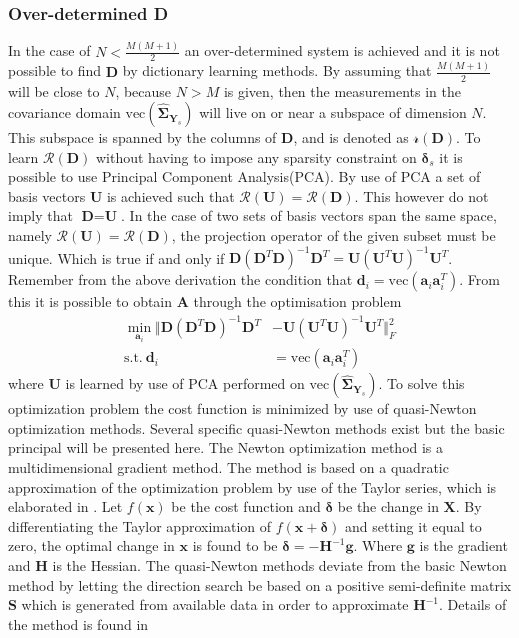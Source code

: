 \subsubsection*{Over-determined \textbf{D}}
In the case of $N < \frac{M(M+1)}{2}$ an over-determined system is achieved and it is not possible to find $\textbf{D}$ by dictionary learning methods.
By assuming that $\frac{M(M+1)}{2}$ will be close to $N$, because $N > M$ is given, then the measurements in the covariance domain $\text{vec}(\widehat{\boldsymbol{\Sigma}}_{\textbf{Y}_s})$ will live on or near a subspace of dimension $N$. 
This subspace is spanned by the columns of $\textbf{D}$, and is denoted as $\mathcal{r}(\textbf{D})$. 
To learn $\mathcal{R}(\textbf{D})$ without having to impose any sparsity constraint on $\boldsymbol{\delta}_s$ it is possible to use Principal Component Analysis(PCA). 
By use of PCA a set of basis vectors $\textbf{U}$ is achieved such that $\mathcal{R}(\textbf{U})=\mathcal{R}(\textbf{D})$. 
This however do not imply that $\textbf{D}=\textbf{U}$. 
In the case of two sets of basis vectors span the same space, namely $\mathcal{R}(\textbf{U})=\mathcal{R}(\textbf{D})$, the projection operator of the given subset must be unique. 
Which is true if and only if $\textbf{D}(\textbf{D}^T\textbf{D})^{-1}\textbf{D}^T=\textbf{U}(\textbf{U}^T\textbf{U})^{-1}\textbf{U}^T$. 
Remember from the above derivation the condition that $\textbf{d}_i = \text{vec}(\textbf{a}_i\textbf{a}_i^T)$. 
From this it is possible to obtain $\textbf{A}$ through the optimisation problem 
\begin{align}
\min_{\textbf{a}_i}\Vert  \textbf{D}(\textbf{D}^T\textbf{D})^{-1}\textbf{D}^T &- \textbf{U}(\textbf{U}^T\textbf{U})^{-1}\textbf{U}^T \Vert_{F}^{2} \nonumber \\
\text{s.t.} \ \textbf{d}_i&=\text{vec}(\textbf{a}_i\textbf{a}_i^T)\label{eq:Cov_DL2}
\end{align}      
where $\textbf{U}$ is learned by use of PCA performed on $\text{vec}(\widehat{\boldsymbol{\Sigma}}_{\textbf{Y}_s})$.
To solve this optimization problem the cost function is minimized by use of quasi-Newton optimization methods.
Several specific quasi-Newton methods exist but the basic principal will be presented here. 
The Newton optimization method is a multidimensional gradient method. 
The method is based on a quadratic approximation of the optimization problem by use of the Taylor series, which is elaborated in \cite[p. 29]{Optimization2007}.
Let $f(\textbf{x})$ be the cost function and $\boldsymbol{\delta}$ be the change in $\textbf{X}$. 
By differentiating the Taylor approximation of $f(\textbf{x}+\boldsymbol{\delta})$ and setting it equal to zero, the optimal change in $\textbf{x}$ is found to be $\boldsymbol{\delta} = -\textbf{H}^{-1}\textbf{g}$. 
Where $\textbf{g}$ is the gradient and $\textbf{H}$ is the Hessian. The quasi-Newton methods deviate from the basic Newton method by letting the direction search be based on a positive semi-definite matrix $\textbf{S}$ which is generated from available data in order to approximate $\textbf{H}^{-1}$. 
Details of the method is found in \cite[p. 175]{Optimization2007}    

